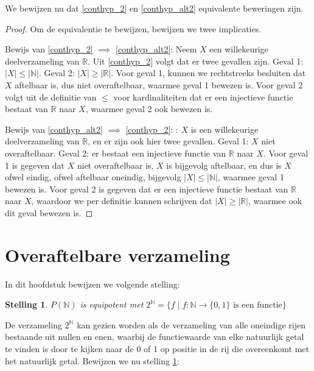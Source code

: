 \documentclass[hidelinks,11pt,a4paper]{article}
\newtheorem{stelling}{Stelling}
\begin{document}
We bewijzen nu dat \eqref{conthyp_2} en \eqref{conthyp_alt2} equivalente beweringen zijn. 

\begin{proof}
Om de equivalentie te bewijzen, bewijzen we twee implicaties.  

Bewijs van \eqref{conthyp_2} $\implies$ \eqref{conthyp_alt2}: Neem $X$ een willekeurige deelverzameling van $\mathbb{R}$. Uit \eqref{conthyp_2} volgt dat er twee gevallen zijn. 
Geval 1: $|X| \leq |\mathbb{N}| $. 
Geval 2: $|X| \geq |\mathbb{R}|$. 
Voor geval 1, kunnen we rechtstreeks besluiten dat $X$ aftelbaar is, dus niet overaftelbaar, waarmee geval 1 bewezen is. 
Voor geval 2 volgt uit de definitie van $\leq$ voor kardinaliteiten dat er een injectieve functie bestaat van $\mathbb{R}$ naar $X$, waarmee geval 2 ook bewezen is. 

Bewijs van \eqref{conthyp_alt2} $\implies$ \eqref{conthyp_2}: : $X$ is een willekeurige deelverzameling van  $\mathbb{R}$, en er zijn ook hier twee gevallen. 
Geval 1: $X$ niet overaftelbaar. 
Geval 2: er bestaat een injectieve functie van $\mathbb{R}$ naar $X$. 
Voor geval 1 is gegeven dat $X$ niet overaftelbaar is, $X$ is bijgevolg aftelbaar, en dus is $X$ ofwel eindig, ofwel aftelbaar oneindig, bijgevolg $|X| \leq |\mathbb{N}| $, waarmee geval 1 bewezen is. 
Voor geval 2 is gegeven dat er een injectieve functie bestaat van $\mathbb{R}$ naar $X$, waardoor we per definitie kunnen schrijven dat $|X| \geq |\mathbb{R}|$, waarmee ook dit geval bewezen is. 
\end{proof}

\section{Overaftelbare verzameling}
\label{sec_overaft}
In dit hoofdstuk bewijzen we volgende stelling: 

\begin{stelling}
\label{stelling_overaftelbaar}
$ P(\mathbb{N})$ is equipotent met $2^{\mathbb{N}} = \{ f \mid f : \mathbb{N} \rightarrow \{0,1\} \text{ is een functie}  \} $
\end{stelling}

De verzameling $2^{\mathbb{N}}$ kan gezien worden als de verzameling van alle oneindige rijen bestaande uit nullen en enen, waarbij de functiewaarde van elke natuurlijk getal te vinden is door te kijken naar de 0 of 1 op positie in de rij die overeenkomt met het natuurlijk getal. 
Bewijzen we nu stelling \ref{stelling_overaftelbaar}: 
\end{document}
